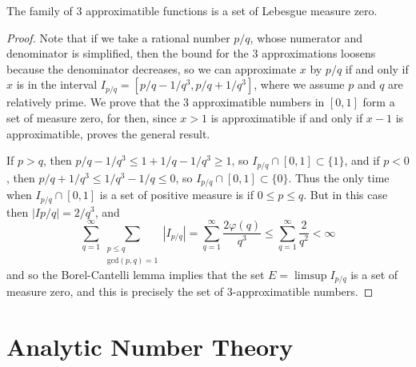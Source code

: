 \begin{theorem}
    The family of 3 approximatible functions is a set of Lebesgue measure zero.
\end{theorem}
\begin{proof}
    Note that if we take a rational number $p/q$, whose numerator and denominator is simplified, then the bound for the 3 approximations loosens because the denominator decreases, so we can approximate $x$ by $p/q$ if and only if $x$ is in the interval $I_{p/q} = [p/q - 1/q^3, p/q + 1/q^3]$, where we assume $p$ and $q$ are relatively prime. We prove that the 3 approximatible numbers in $[0,1]$ form a set of measure zero, for then, since $x > 1$ is approximatible if and only if $x - 1$ is approximatible, proves the general result.

    If $p > q$, then $p/q - 1/q^3 \leq 1 + 1/q - 1/q^3 \geq 1$, so $I_{p/q} \cap [0,1] \subset \{ 1 \}$, and if $p < 0$, then $p/q + 1/q^3 \leq 1/q^3 - 1/q \leq 0$, so $I_{p/q} \cap [0,1] \subset \{ 0 \}$. Thus the only time when $I_{p/q} \cap [0,1]$ is a set of positive measure is if $0 \leq p \leq q$. But in this case then $|I{p/q}| = 2/q^3$, and
    \[ \sum_{q = 1}^\infty \sum_{\substack{p \leq q\\\text{gcd}(p,q) = 1}} |I_{p/q}| = \sum_{q = 1}^\infty \frac{2 \varphi(q)}{q^3} \leq \sum_{q = 1}^\infty \frac{2}{q^2} < \infty \]
    and so the Borel-Cantelli lemma implies that the set $E = \limsup I_{p/q}$ is a set of measure zero, and this is precisely the set of 3-approximatible numbers.
\end{proof}

\part{Analytic Number Theory}

